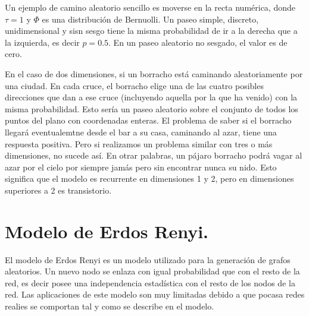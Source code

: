 \documentclass{llncs}
\theoremstyle{plane}
\begin{document}
Un ejemplo de camino aleatorio  sencillo es moverse en la recta numérica, donde $\tau=1$ y $\Phi$ es una distribución de Bernuolli. Un paseo simple, discreto, unidimensional y sisn sesgo tiene la misma probabilidad de ir a la derecha que a la izquierda, es decir $p=0.5$. En un paseo aleatorio no sesgado, el valor es de cero. 

En el caso de dos dimensiones, si un borracho está caminando aleatoriamente por una ciudad. En cada cruce, el borracho elige una de las cuatro posibles direcciones que dan a ese cruce (incluyendo aquella por la que ha venido) con la misma probabilidad. Esto sería un paseo aleatorio sobre el conjunto de todos los puntos del plano con coordenadas enteras. El problema de saber si el borracho llegará eventualemtne desde el bar a su casa, caminando al azar, tiene una respuesta positiva. Pero si realizamos un problema similar con tres o más dimensiones, no sucede así. En otrar palabras, un pájaro borracho podrá vagar al azar por el cielo por siempre jamás pero sin encontrar nunca su nido.  Esto significa que el modelo es recurrente en dimensiones 1 y 2, pero en dimensiones superiores a 2 es transistorio.


\section{Modelo de Erdos Renyi.}

El modelo de Erdos Renyi es un modelo utilizado para la generación de grafos aleatorios. Un nuevo nodo se enlaza con igual probabilidad que con el resto de la red, es decir posee una independencia estadística con el resto de los nodos de la red. Las aplicaciones de este modelo son muy limitadas debido a que pocasa redes realies se comportan tal y como se describe en el modelo.
\end{document}
